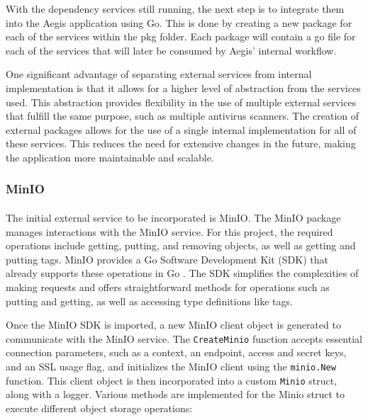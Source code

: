 \documentclass[12pt, conference, final, a4paper, onecolumn, compsoc]{IEEEtran}
\begin{document}
With the dependency services still running, the next step is to integrate them
into the Aegis application using Go. This is done by creating a new package for
each of the services within the pkg folder. Each package will contain a go file
for each of the services that will later be consumed by Aegis' internal
workflow.

One significant advantage of separating external services from internal
implementation is that it allows for a higher level of abstraction from the
services used. This abstraction provides flexibility in the use of multiple
external services that fulfill the same purpose, such as multiple antivirus
scanners. The creation of external packages allows for the use of a single
internal implementation for all of these services. This reduces the need for
extensive changes in the future, making the application more maintainable and
scalable.

\subsubsection*{MinIO}
\paragraph{}

The initial external service to be incorporated is MinIO. The MinIO package
manages interactions with the MinIO service. For this project, the required
operations include getting, putting, and removing objects, as well as getting
and putting tags. MinIO provides a Go Software Development Kit (SDK) that
already supports these operations in Go \citep{minio-go-repo}. The SDK
simplifies the complexities of making requests and offers straightforward
methods for operations such as putting and getting, as well as accessing type
definitions like tags.

Once the MinIO SDK is imported, a new MinIO client object is generated to
communicate with the MinIO service. The \texttt{CreateMinio} function accepts
essential connection parameters, such as a context, an endpoint, access and
secret keys, and an SSL usage flag, and initializes the MinIO client using the
\texttt{minio.New} function. This client object is then incorporated into a
custom \texttt{Minio} struct, along with a logger. Various methods are
implemented for the Minio struct to execute different object storage operations:
\end{document}
